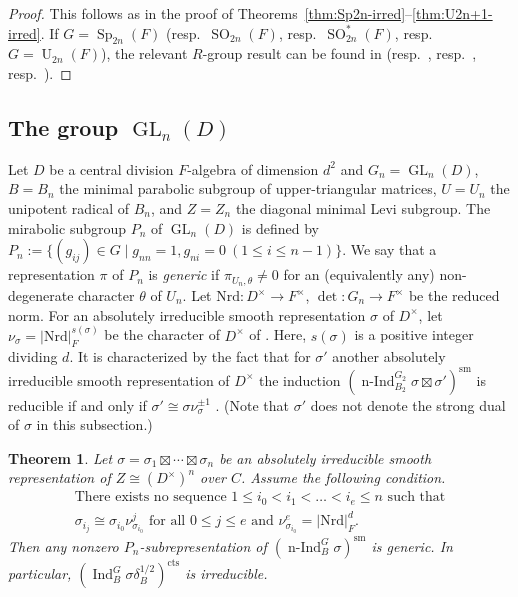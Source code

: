 \documentclass[a4paper]{amsart}
\numberwithin{equation}{section}
\newtheorem{thm}{Theorem}[section]
\theoremstyle{remark}
\theoremstyle{definition}
\DeclareMathOperator{\Ind}{Ind}
\DeclareMathOperator{\nInd}{n-Ind}
\DeclareMathOperator{\U}{U}
\DeclareMathOperator{\Sp}{Sp}
\DeclareMathOperator{\SO}{SO}
\DeclareMathOperator{\GL}{GL}
\newcommand{\sm}{\mathrm{sm}}
\newcommand{\cts}{\mathrm{cts}}
\newcommand{\Nrd}{\mathrm{Nrd}}
\renewcommand{\simeq}{\cong}
\begin{document}
\begin{proof}
  This follows as in the proof of Theorems~\ref{thm:Sp2n-irred}--\ref{thm:U2n+1-irred}.
  If $G = \Sp_{2n}(F)$ (resp.\ $\SO_{2n}(F)$, resp.\ $\SO^*_{2n}(F)$, resp.\ $G = \U_{2n}(F)$), the relevant $R$-group result
  can be found in \cite[Theorem 6.4]{MR1296726} (resp.\ \cite[Theorem 6.8]{MR1296726}, resp.\ \cite[Theorem A.4]{MR3430367}, resp.\ \cite[Theorem 3.4]{MR1224616}).
\end{proof}


\subsection{The group \texorpdfstring{$\GL_{n}(D)$}{GL\_n(D)}}
\label{sec:GL(n,D)}

Let $D$ be a central division $F$-algebra of dimension $d^{2}$ and $G_{n} = \GL_{n}(D)$, $B = B_{n}$ the minimal parabolic subgroup of upper-triangular matrices, $U = U_{n}$ the unipotent radical of $B_{n}$, and $Z = Z_{n}$ the diagonal minimal Levi subgroup.
The mirabolic subgroup $P_{n}$ of $\GL_{n}(D)$ is defined by $P_{n} := \{(g_{ij})\in G\mid g_{nn} = 1, g_{ni} = 0\ (1\le i\le n  - 1)\}$.
We say that a representation $\pi$ of $P_{n}$ is \emph{generic} if $\pi_{U_{n},\theta} \ne 0$ for an (equivalently any) non-degenerate character $\theta$ of $U_{n}$.
Let $\Nrd\colon D^{\times}\to F^{\times}$, $\det\colon G_n\to F^{\times}$ be the reduced norm.
For an absolutely irreducible smooth representation $\sigma$ of $D^{\times}$, let $\nu_{\sigma} = \lvert\Nrd\rvert_{F}^{s(\sigma)}$ be the character of $D^{\times}$ of \cite[Section 2]{MR1040995}.
Here, $s(\sigma)$ is a positive integer dividing $d$.
It is characterized by the fact that for $\sigma'$ another absolutely irreducible smooth representation of $D^\times$ the induction $(\nInd_{B_{2}}^{G_{2}}\sigma\boxtimes \sigma')^\sm$ is reducible if and only if $\sigma' \cong \sigma\nu_{\sigma}^{\pm 1}$ \cite[2.5 Lemma, 4.2 Lemma]{MR1040995}.
(Note that $\sigma'$ does not denote the strong dual of $\sigma$ in this subsection.)

\begin{thm}\label{thm:GL(n,D),dim>1}
Let $\sigma = \sigma_{1}\boxtimes\cdots\boxtimes\sigma_{n}$ be an absolutely irreducible smooth representation of $Z\simeq (D^{\times})^{n}$ over $C$.
Assume the following condition.
\begin{equation}\label{eq:seq}
  \begin{gathered}
    \text{There exists no sequence $1 \le i_0 < i_1 < \dots < i_e \le n$ such that}\\
    \text{$\sigma_{i_j} \cong \sigma_{i_0} \nu_{\sigma_{i_0}}^j$ for all $0 \le j \le e$ and
      $\nu_{\sigma_{i_0}}^e = \lvert\Nrd\rvert_{F}^{d}$}.
  \end{gathered}
\end{equation}
Then any nonzero $P_{n}$-subrepresentation of $(\nInd_{B}^{G}\sigma)^{\sm}$ is generic.
In particular, $(\Ind_{B}^{G}\sigma\delta_{B}^{1/2})^{\cts}$ is irreducible.
\end{thm}
\end{document}
